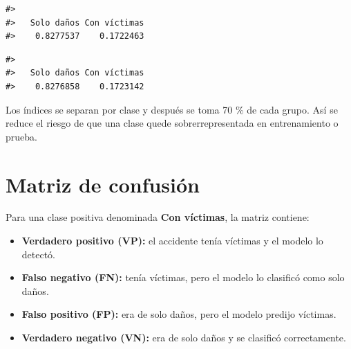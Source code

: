 \documentclass[
  spanish,
  10.5pt,
  letterpaper,
  openany,
  headings=big]{scrbook}
\newenvironment{Shaded}{}{}
\newcommand{\FunctionTok}[1]{\textcolor[rgb]{0.44,0.26,0.76}{#1}}
\newcommand{\NormalTok}[1]{\textcolor[rgb]{0.14,0.16,0.18}{#1}}
\newcommand{\SpecialCharTok}[1]{\textcolor[rgb]{0.00,0.36,0.77}{#1}}
\providecommand{\tightlist}{%
  \setlength{\itemsep}{0pt}\setlength{\parskip}{0pt}}
\begin{document}
\begin{verbatim}
#> 
#>   Solo daños Con víctimas 
#>    0.8277537    0.1722463
\end{verbatim}

\begin{Shaded}
\end{Shaded}

\begin{verbatim}
#> 
#>   Solo daños Con víctimas 
#>    0.8276858    0.1723142
\end{verbatim}

\begin{tcolorbox}[enhanced jigsaw, arc=.35mm, bottomrule=.15mm, bottomtitle=1mm, breakable, colback=white, colbacktitle=quarto-callout-note-color!10!white, colframe=quarto-callout-note-color-frame, coltitle=black, left=2mm, leftrule=.75mm, opacityback=0, opacitybacktitle=0.6, rightrule=.15mm, title=\textcolor{quarto-callout-note-color}{\faInfo}\hspace{0.5em}{Explicación del código}, titlerule=0mm, toprule=.15mm, toptitle=1mm]

Los índices se separan por clase y después se toma 70 \% de cada grupo.
Así se reduce el riesgo de que una clase quede sobrerrepresentada en
entrenamiento o prueba.

\end{tcolorbox}

\section{Matriz de confusión}\label{matriz-de-confusiuxf3n}

Para una clase positiva denominada \textbf{Con víctimas}, la matriz
contiene:

\begin{itemize}
\tightlist
\item
  \textbf{Verdadero positivo (VP):} el accidente tenía víctimas y el
  modelo lo detectó.
\item
  \textbf{Falso negativo (FN):} tenía víctimas, pero el modelo lo
  clasificó como solo daños.
\item
  \textbf{Falso positivo (FP):} era de solo daños, pero el modelo
  predijo víctimas.
\item
  \textbf{Verdadero negativo (VN):} era de solo daños y se clasificó
  correctamente.
\end{itemize}
\end{document}
